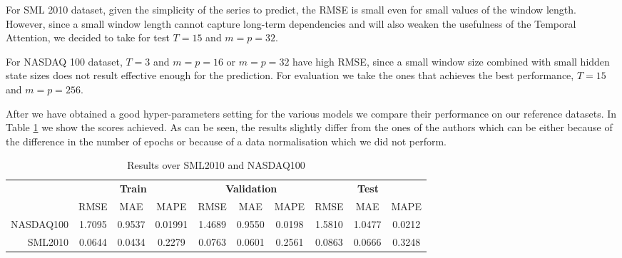 \documentclass{article}
\begin{document}
For SML 2010 dataset, given the simplicity of the series to predict, the RMSE
is small even for
small values of the window length. However, since a small window length cannot
capture
long-term dependencies and will also weaken the usefulness of the Temporal
Attention,
we decided to take for test $T = 15$ and $m=p=32$.

For NASDAQ 100 dataset, $T=3$ and $m=p=16$ or $m=p=32$ have high RMSE, since a
small window
size combined with small hidden state sizes does not result effective enough
for the
prediction. For evaluation we take the ones that achieves the best performance,
$T=15$ and $m=p=256$.

After we have obtained a good hyper-parameters setting for the various models
we
compare their performance on our reference datasets.
In Table \ref{results} we show the scores achieved. As can be seen, the results
slightly differ
from the ones of the authors which can be either because of the difference in
the number of epochs
or because of a data normalisation which we did not perform.
\begin{center}
\begin{table}
\begin{tabular}{r|c|c|c|c|c|c|c|c|c|}
\multicolumn{1}{r}{}
  & \multicolumn{3}{c}{\textbf{Train}}
  & \multicolumn{3}{c}{\textbf{Validation}}
  & \multicolumn{3}{c}{\textbf{Test}} \\
  \cline{2-10}
  & \multicolumn{1}{c}{RMSE}
  & \multicolumn{1}{c}{MAE}
  & \multicolumn{1}{c|}{MAPE}
  & \multicolumn{1}{c}{RMSE}
  & \multicolumn{1}{c}{MAE}
  & \multicolumn{1}{c|}{MAPE}
  & \multicolumn{1}{c}{RMSE}
  & \multicolumn{1}{c}{MAE}
  & \multicolumn{1}{c|}{MAPE}\\
\cline{2-10}
NASDAQ100 & 1.7095 & 0.9537 & 0.01991 & 1.4689 & 0.9550 & 0.0198 & 1.5810 &
1.0477 & 0.0212 \\
\cline{2-10}
SML2010 & 0.0644 & 0.0434 & 0.2279 & 0.0763 & 0.0601 & 0.2561 & 0.0863 & 0.0666
& 0.3248 \\
\cline{2-10}
\end{tabular}
\vspace{1em}
\caption{Results over SML2010 and NASDAQ100}
\label{results}
\end{table}
\end{center}
\end{document}
